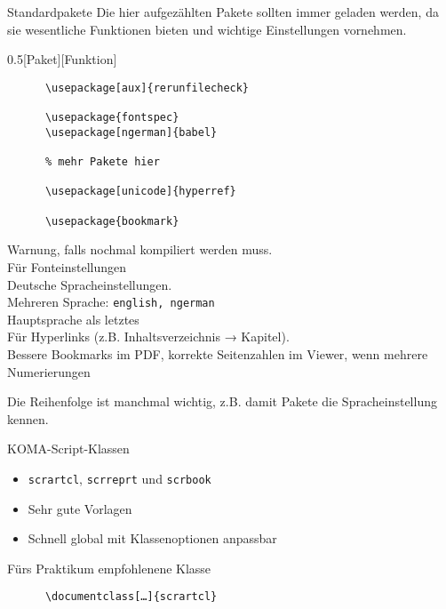 \begin{frame}[fragile]{Standardpakete}
  Die hier aufgezählten Pakete sollten immer geladen werden, da sie wesentliche Funktionen bieten und wichtige Einstellungen vornehmen.
  \vspace{-1em}
  \begin{CodeExplanation}{0.5}[Paket][Funktion]
    \begin{verbatim}
      \usepackage[aux]{rerunfilecheck}

      \usepackage{fontspec}
      \usepackage[ngerman]{babel}

      % mehr Pakete hier

      \usepackage[unicode]{hyperref}

      \usepackage{bookmark}
    \end{verbatim}
  \Explanation
    Warnung, falls nochmal kompiliert werden muss. \\[\baselineskip]
    Für Fonteinstellungen \\
    Deutsche Spracheinstellungen. \\
    Mehreren Sprache: \texttt{english, ngerman} \\
    Hauptsprache als letztes \\[\baselineskip]
    Für Hyperlinks (z.B. Inhaltsverzeichnis → Kapitel). \\
    Bessere Bookmarks im PDF,
    korrekte Seitenzahlen im Viewer, wenn mehrere Numerierungen
  \end{CodeExplanation}
  Die Reihenfolge ist manchmal wichtig, z.B. damit Pakete die Spracheinstellung kennen.
\end{frame}

\begin{frame}[fragile]{
  KOMA-Script-Klassen
  \hfill
}
  \begin{itemize}
    \item \texttt{scrartcl}, \texttt{scrreprt} und \texttt{scrbook}
    \item Sehr gute Vorlagen
    \item Schnell global mit Klassenoptionen anpassbar
  \end{itemize}
  \begin{block}{Fürs Praktikum empfohlenene Klasse}
    \begin{verbatim}
      \documentclass[…]{scrartcl}
    \end{verbatim}
  \end{block}
\end{frame}

